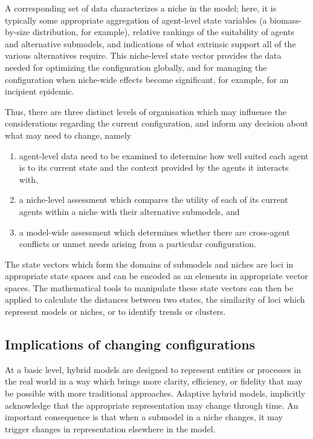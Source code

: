 A corresponding set of data characterizes a niche in the model; here,
it is typically some appropriate aggregation of agent-level state
variables (a biomass-by-size distribution, for example), relative
rankings of the suitability of agents and alternative sub\-models, and
indications of what extrinsic support all of the various alternatives
require. This niche-level state vector provides the data needed for
optimizing the con\-fig\-ur\-a\-tion globally,
and for managing the con\-fig\-ur\-a\-tion when niche-wide effects
become significant, for example, for an incipient epidemic.

Thus, there are three distinct levels of organisation which may
influence the considerations regarding the current configur\-ation, and
inform any decision about what may need to change, namely
\begin{enumerate}
\item agent-level data need to be examined to determine how well
  suited each agent is to its current state and the context provided
  by the agents it interacts with,
\item a niche-level assessment which compares the utility of each of
  its current agents within a niche with their alternative sub\-models,
  and
\item a model-wide assessment which determines whether there are
  cross-agent conflicts or unmet needs arising from a particular
  con\-fig\-ur\-a\-tion.
\end{enumerate}

The state vectors which form the domains of sub\-models and niches are
loci in appropriate state spaces and can be encoded as an elements in
appropriate vector spaces. The math\-e\-mat\-i\-cal tools to manipulate these
state vectors can then be applied to calculate the distances between
two states, the similarity of loci which represent models or niches,
or to identify trends or clusters.



\subsection{Implications of changing con\-fig\-ur\-a\-tions}

At a basic level, hybrid models are designed to represent entities or
processes in the real world in a way which brings more clarity,
efficiency, or fidelity that may be possible with more traditional
approaches. Adaptive hybrid models, implicitly acknowledge that the
appropriate rep\-re\-sen\-ta\-tion may change through time. An important
consequence is that when a sub\-model in a niche changes, it may trigger
changes in rep\-re\-sen\-ta\-tion elsewhere in the model.

